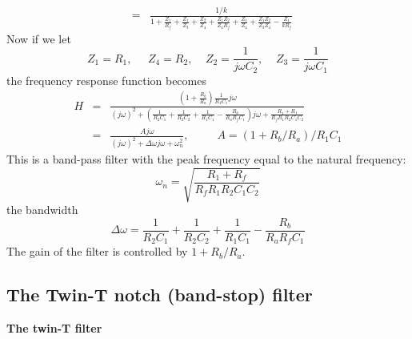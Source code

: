 \documentclass{article}
\begin{document}
\begin{itemize}
\begin{eqnarray}
    \nonumber \\
    &=&
    \frac{1/k}{1+\frac{Z_1}{R_f}+\frac{Z_1}{Z_3}+\frac{Z_2}{Z_4}+\frac{Z_1Z_2}{Z_4R_f}+\frac{Z_1}{Z_4}+\frac{Z_1Z_2}{Z_3Z_4}-\frac{Z_1}{kR_f}}
  \end{eqnarray}
  Now if we let
  \begin{equation}
  Z_1=R_1,\;\;\;\;\;Z_4=R_2,\;\;\;\;Z_2=\frac{1}{j\omega C_2},
  \;\;\;\;Z_3=\frac{1}{j\omega C_1}
  \end{equation}
  the frequency response function becomes
  \begin{eqnarray}
  H&=&\frac{\left(1+\frac{R_b}{R_a}\right)\frac{1}{R_1C_1}j\omega}{(j\omega)^2+\left(\frac{1}{R_2C_1}+\frac{1}{R_2C_2}+\frac{1}{R_1C_1}-\frac{R_b}{R_aR_fC_1}\right)j\omega+\frac{R_1+R_f}{R_fR_1R_2C_1C_2}}
  \nonumber\\
  &=&\frac{Aj\omega}{(j\omega)^2+\Delta\omega j\omega+\omega_n^2},
  \;\;\;\;\;\;\;\;\;
  A=(1+R_b/R_a)/R_1C_1
  \end{eqnarray}
  This is a band-pass filter with the peak frequency equal to the natural
  frequency:
  \begin{equation}
  \omega_n=\sqrt{\frac{R_1+R_f}{R_fR_1R_2C_1C_2}}
  \end{equation}
  the bandwidth
  \begin{equation}
  \Delta\omega=\frac{1}{R_2C_1}+\frac{1}{R_2C_2}+\frac{1}{R_1C_1}-\frac{R_b}{R_aR_fC_1}
  \end{equation}
  The gain of the filter is controlled by $1+R_b/R_a$.
  
\end{itemize}


\subsection{The Twin-T notch (band-stop) filter}

{\bf The twin-T filter}

\end{document}

